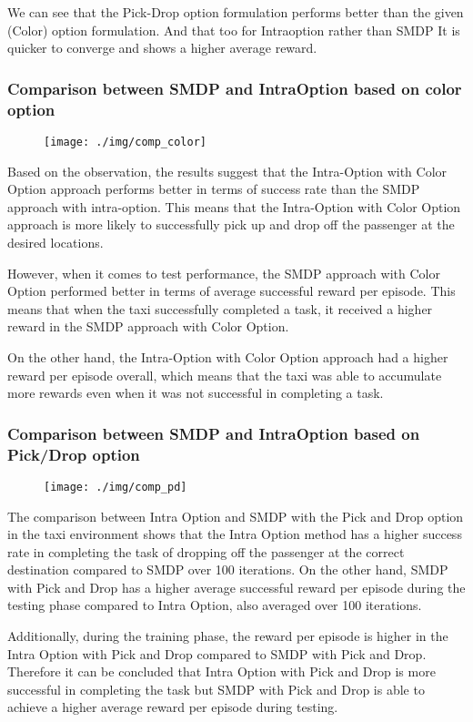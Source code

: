 \documentclass[A4]{article}
\begin{document}
    We can see that the Pick-Drop option formulation performs better than the given (Color) option formulation.
    And that too for Intraoption rather than SMDP
    It is quicker to converge and shows a higher average reward.

    \subsubsection{Comparison between SMDP and IntraOption based on color option }
    \begin{figure}[H]
        \centering
        \centering
        \texttt{[image: ./img/comp\_color]}
    \end{figure}
    Based on the observation, the results suggest that the Intra-Option with Color Option approach performs better in terms of success rate than the SMDP approach with intra-option. This means that the Intra-Option with Color Option approach is more likely to successfully pick up and drop off the passenger at the desired locations.

    However, when it comes to test performance, the SMDP approach with Color Option performed better in terms of average successful reward per episode. This means that when the taxi successfully completed a task, it received a higher reward in the SMDP approach with Color Option.

    On the other hand, the Intra-Option with Color Option approach had a higher reward per episode overall, which means that the taxi was able to accumulate more rewards even when it was not successful in completing a task.

    \subsubsection{Comparison between SMDP and IntraOption based on Pick/Drop option}
    \begin{figure}[H]
        \centering
        \centering
        \texttt{[image: ./img/comp\_pd]}
    \end{figure}
    The comparison between Intra Option and SMDP with the Pick and Drop option in the taxi environment shows that the Intra Option method has a higher success rate in completing the task of dropping off the passenger at the correct destination compared to SMDP over 100 iterations. On the other hand, SMDP with Pick and Drop has a higher average successful reward per episode during the testing phase compared to Intra Option, also averaged over 100 iterations.

    Additionally, during the training phase, the reward per episode is higher in the Intra Option with Pick and Drop compared to SMDP with Pick and Drop. Therefore it can be concluded that Intra Option with Pick and Drop is more successful in completing the task but SMDP with Pick and Drop is able to achieve a higher average reward per episode during testing.
\end{document}
